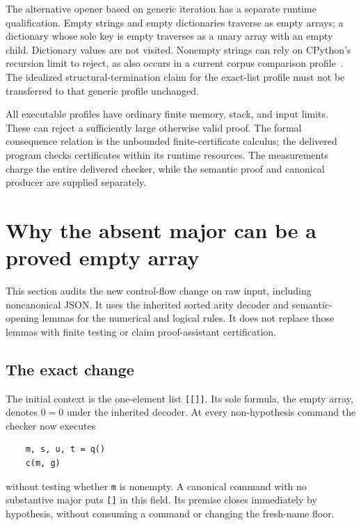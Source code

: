 \documentclass[11pt,letterpaper]{article}
\theoremstyle{definition}\newtheorem{definition}[theorem]{Definition}
\theoremstyle{remark}\newtheorem{remark}[theorem]{Remark}
\begin{document}
The alternative opener based on generic iteration has a separate
runtime qualification.  Empty strings and empty dictionaries traverse
as empty arrays; a dictionary whose sole key is empty traverses as a
unary array with an empty child.  Dictionary values are not visited.
Nonempty strings can rely on CPython's recursion limit to reject, as
also occurs in a current corpus comparison profile~\cite{transient}.
The idealized structural-termination claim for the exact-list profile
must not be transferred to that generic profile unchanged.

All executable profiles have ordinary finite memory, stack, and input
limits.  These can reject a sufficiently large otherwise valid proof.
The formal consequence relation is the unbounded finite-certificate
calculus; the delivered program checks certificates within its runtime
resources.  The measurements charge the entire delivered checker,
while the semantic proof and canonical producer are supplied separately.


\section{Why the absent major can be a proved empty array}
\label{sec:neutral-major-audit}

This section audits the new control-flow change on raw input, including
noncanonical JSON.  It uses the inherited sorted arity decoder and
semantic-opening lemmas for the numerical and logical rules.  It does not
replace those lemmas with finite testing or claim proof-assistant
certification.

\subsection{The exact change}

The initial context is the one-element list \texttt{[[]]}.  Its sole
formula, the empty array, denotes $0=0$ under the inherited decoder.
At every non-hypothesis command the checker now executes
\begin{verbatim}
    m, s, u, t = q()
    c(m, g)
\end{verbatim}
without testing whether \texttt{m} is nonempty.  A canonical command with
no substantive major puts \texttt{[]} in this field.  Its premise closes
immediately by hypothesis, without consuming a command or changing the
fresh-name floor.
\end{document}
